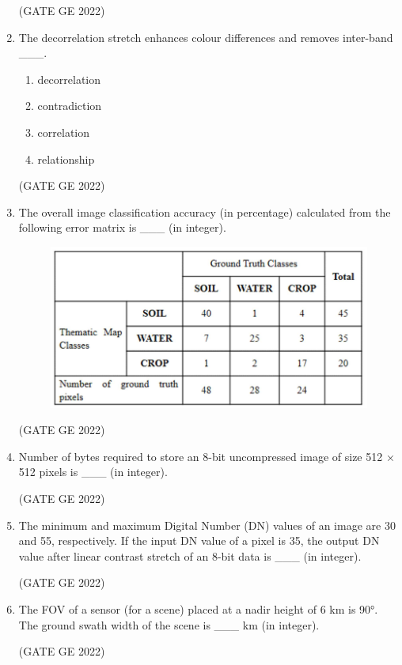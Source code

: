 \documentclass[a4paper, 11pt]{article}
\begin{document}
\begin{enumerate}
\hfill (GATE GE 2022)

\item The decorrelation stretch enhances colour differences and removes inter-band \_\_\_.
\begin{enumerate}
    \item decorrelation
    \item contradiction
    \item correlation
    \item relationship
\end{enumerate}

\hfill (GATE GE 2022)

\item The overall image classification accuracy (in percentage) calculated from the following error matrix is \_\_\_ (in integer).
\begin{figure}[H]
    \centering
    \includegraphics[width=\columnwidth]{figs/fig_81.png}
    \label{fig:placeholder}
\end{figure}

\hfill (GATE GE 2022)

\item Number of bytes required to store an 8-bit uncompressed image of size 512 × 512 pixels is \_\_\_ (in integer).

\hfill (GATE GE 2022)

\item The minimum and maximum Digital Number (DN) values of an image are 30 and 55, respectively. If the input DN value of a pixel is 35, the output DN value after linear contrast stretch of an 8-bit data is \_\_\_ (in integer).

\hfill (GATE GE 2022)

\item The FOV of a sensor (for a scene) placed at a nadir height of 6 km is 90°. The ground swath width of the scene is \_\_\_ km (in integer).

\hfill (GATE GE 2022)

\end{enumerate}
\end{document}
